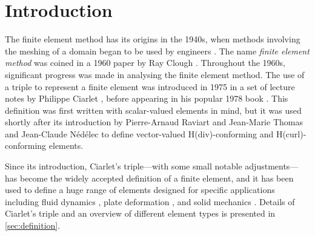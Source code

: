 \documentclass[sn-mathphys-num]{sn-jnl}%
\theoremstyle{thmstyleone}%
\theoremstyle{thmstyletwo}%
\theoremstyle{thmstylethree}%
\begin{document}
\section{Introduction}\label{intro}

The finite element method has its origins in the 1940s, when methods involving the meshing of a domain began to be used by engineers \cite{courant,80years,25years}.
The name \emph{finite element method} was coined in a 1960 paper by Ray Clough \cite{clough1960}. Throughout the 1960s, significant progress was made
in analysing the finite element method.
The use of a triple to represent a finite element was introduced in 1975 in a set of lecture notes by Philippe Ciarlet \cite{CiarletLectureNotes},
before appearing in his popular 1978 book \cite{ciarlet}. This definition was first written with scalar-valued elements in mind, but it was used shortly after its introduction by
Pierre-Arnaud Raviart and Jean-Marie Thomas \cite{rt} and Jean-Claude N\'ed\'elec \cite{nedelec1} to define vector-valued H(div)-conforming and H(curl)-conforming elements.

Since its introduction, Ciarlet's triple---with some small notable adjustments---has become the widely accepted definition of a finite element, and it has been used to define a huge range of elements
designed for specific applications including
fluid dynamics \cite{guzman-neilan,rannacher-turek},
plate deformation \cite{pechstein-schoberl},
and solid mechanics \cite{serendipity}.
Details of Ciarlet's triple and an overview of different element types is presented in \cref{sec:definition}.
\end{document}
